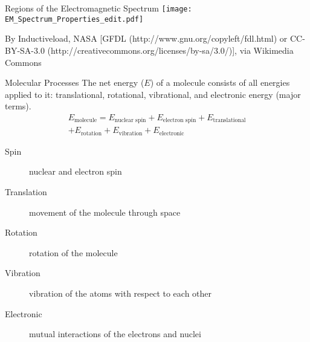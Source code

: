 \documentclass[notes=show]{beamer}
\begin{document}
\begin{frame}{Regions of the Electromagnetic Spectrum}
	\texttt{[image: EM\_Spectrum\_Properties\_edit.pdf]}

	\footnotesize{By Inductiveload, NASA [GFDL
	(http://www.gnu.org/copyleft/fdl.html) or CC-BY-SA-3.0
	(http://creativecommons.org/licenses/by-sa/3.0/)], via Wikimedia
	Commons}
\end{frame}

\begin{frame}[allowframebreaks]{Molecular Processes}
	The net energy ($E$) of a molecule consists of all energies applied to
	it: \alert{translational}, \alert{rotational}, \alert{vibrational}, and
	\alert{electronic energy} (major terms).
	\begin{multline*}
		E_\text{molecule} = E_\text{nuclear spin} + E_\text{electron
		spin} + E_\text{translational} \\ + E_\text{rotation} +
		E_\text{vibration} + E_\text{electronic}
	\end{multline*}

	\begin{description}
		\item[Spin       ] nuclear and electron spin
		\item[Translation] movement of the molecule through space
		\item[Rotation   ] rotation of the molecule
		\item[Vibration  ] vibration of the atoms with respect to each other
		\item[Electronic ] mutual interactions of the electrons and nuclei
\end{description}

\framebreak

\end{frame}
\end{document}
